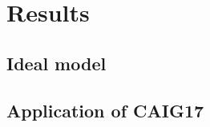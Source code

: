 \chapter{Results}
\label{cha:results}

\section{Ideal model}

\section{Application of CAIG17}

\newpage

